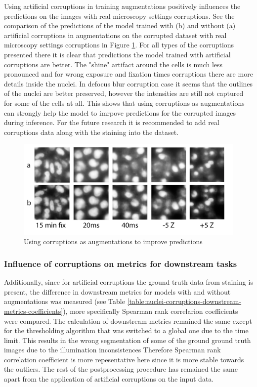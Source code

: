 Using artificial corruptions in training augmentations positively influences the predictions on the images with real microscopy settings corruptions. See the comparison of the predictions of the model trained with (b) and without (a) artificial corruptions in augmentations on the corrupted dataset with real microscopy settings corruptions in Figure \ref{fig:augments-help-real}. For all types of the corruptions presented there it is clear that predictions the model trained with artificial corruptions are better. The "shine" artifact around the cells is much less pronounced and for wrong exposure and fixation times corruptions there are more details inside the nuclei. In defocus blur corruption case it seems that the outlines of the nuclei are better preserved, however the intensities are still not captured for some of the cells at all. This shows that using corruptions as augmentations can strongly help the model to imrpove predictions for the corrupted images during inference. For the future research it is recommended to add real corruptions data along with the staining into the dataset.
\begin{figure}[htb]
	\begin{center}
		\includegraphics[width=0.6\linewidth]{bilder/stability/augments-help-real.png}
		\caption{Using corruptions as augmentations to improve predictions}\label{fig:augments-help-real}
	\end{center}
\end{figure}

\subsubsection{Influence of corruptions on metrics for downstream tasks}
Additionally, since for artificial corruptions the ground truth data from staining is present, the difference in downstream metrics for models with and without augmentations was measured (see Table \ref{table:nuclei-corruptions-downstream-metrics-coefficients}), more specifically Spearman rank correlarion coefficients were compared. The calculation of downstream metrics remained the same except for the thresholding algorithm that was switched to a global one due to the time limit. This results in the wrong segmentation of some of the ground ground truth images due to the illumination inconsistences Therefore Spearman rank correlation coefficient is more repesentative here since it is more stable towards the outliers. The rest of the postprocessing procedure has remained the same apart from the application of artificial corruptions on the input data.

